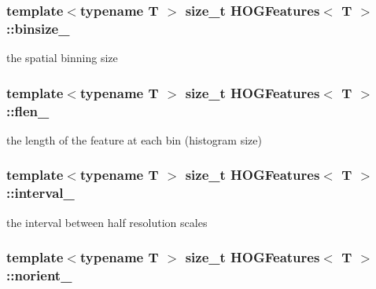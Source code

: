 \subsubsection[{binsize\+\_\+}]{\setlength{\rightskip}{0pt plus 5cm}template$<$typename T $>$ size\+\_\+t {\bf H\+O\+G\+Features}$<$ T $>$\+::binsize\+\_\+\hspace{0.3cm}{\ttfamily [private]}}\label{classHOGFeatures_afd93266461d3389e4c61a9c06fc81f4f}


the spatial binning size 

\hypertarget{classHOGFeatures_a8cf4e36a70e13230efbe8abe97928748}{}
\subsubsection[{flen\+\_\+}]{\setlength{\rightskip}{0pt plus 5cm}template$<$typename T $>$ size\+\_\+t {\bf H\+O\+G\+Features}$<$ T $>$\+::flen\+\_\+\hspace{0.3cm}{\ttfamily [private]}}\label{classHOGFeatures_a8cf4e36a70e13230efbe8abe97928748}


the length of the feature at each bin (histogram size) 

\hypertarget{classHOGFeatures_aaa063fbfe2ce734ee08a10d7292cfb54}{}
\subsubsection[{interval\+\_\+}]{\setlength{\rightskip}{0pt plus 5cm}template$<$typename T $>$ size\+\_\+t {\bf H\+O\+G\+Features}$<$ T $>$\+::interval\+\_\+\hspace{0.3cm}{\ttfamily [private]}}\label{classHOGFeatures_aaa063fbfe2ce734ee08a10d7292cfb54}


the interval between half resolution scales 

\hypertarget{classHOGFeatures_a2c2f06c85eed3a2b2f93574116b961f7}{}
\subsubsection[{norient\+\_\+}]{\setlength{\rightskip}{0pt plus 5cm}template$<$typename T $>$ size\+\_\+t {\bf H\+O\+G\+Features}$<$ T $>$\+::norient\+\_\+\hspace{0.3cm}{\ttfamily [private]}}\label{classHOGFeatures_a2c2f06c85eed3a2b2f93574116b961f7}


